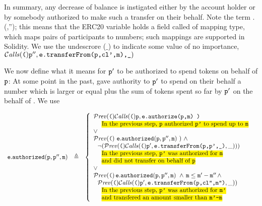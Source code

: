 {\noindent
In summary, any decrease of balance is instigated either by the account holder or by somebody authorized to make such a transfer on their behalf. Note the term .(,''); this means that the 
ERC20 variable  holds a field called  of   mapping type, which maps pairs of participants to numbers; such
mappings are supported in Solidity\cite{Solidity,}. %
We use the undescrore ($\_$) to indicate some value of no importance, \eg ${\mathcal{C}}\textrm{\textit{alls}}({\mbox{\tt{(}}}){\mbox{\tt{p}}}'',{\mbox{\tt{e.transferFrom(p,cl',m),\_}}})$ 

We now define what it means for ${\mbox{\tt{p}}}'$ to be authorized to spend  tokens on behalf of ${\mbox{\tt{p}}}$: At some point in the
past,   gave authority to ${\mbox{\tt{p}}}'$  to spend on their behalf  a number %
which is larger or equal    
plus the sum of  tokens 
spent so far by ${\mbox{\tt{p}}}' $ on the behalf of . We use 

\vspace{.06cm}
\noindent
$
\begin{array}{lcl}
 \prg{e}.\prg{authorized}(\prg{p},\prg{p}'',\prg{m})
&
 \triangleq 
&
  \left\{
                            \begin{array}{l}
                              \Prev(\Calls(\prg{p},\prg{e.authorize(p,m)\ )}\     \\
                             \strut \ \  \mbox{\hlc[yellow]{In the previous step, {\tt p} authorized {\tt p'} to spend up to  {\tt m}}}\\
                               \vee \\
                           \Prev(\ \prg{e}.\prg{authorized}(\prg{p},\prg{p}'',\prg{m})\ ) \,  \,   \wedge\,   \\
                               \ \  \neg (\Prev(\Calls(\prg{p}',\prg{e.transferFrom(p,p',\_)},\_ ) ) )\\
                               \strut \ \  \mbox{\hlc[yellow]{In the previous step, {\tt p'} was authorized for  {\tt m}}}\\
                               \strut \ \  \mbox{\hlc[yellow]{and did not transfer on behalf of  {\tt p}}}\\
                               \vee \\
                              \Prev(\, \prg{e}.\prg{authorized}(\prg{p},\prg{p}'',\prg{m})\,  \,   \wedge\, \prg{m}\leq \prg{m}'-\prg{m}''\, \wedge \, \\
                               \ \  \Prev(\Calls(\prg{p}',\prg{e.transferFrom(p,cl'',m'')},\_ ) ) 
                               \\
                                  \strut \ \  \mbox{\hlc[yellow]{In the previous step, {\tt p'} was authorized for  {\tt m'}}}\\
                               \strut \ \  \mbox{\hlc[yellow]{and transfered an amount smaller than   {\tt m'-m}}}
                        \end{array} 
                         \right.
 \end{array}
 $                        
 
}
